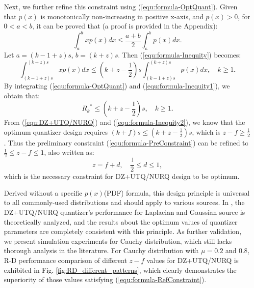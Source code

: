 \documentclass[smallabstract,smallcaptions]{dccpaper}
\begin{document}
Next, we further refine this constraint using (\ref{equ:formula-OptQuant}). Given that $p(x)$ is monotonically non-increasing in positive x-axis, and $p(x) > 0$, for $0 < a < b$, it can be proved that (a proof is provided in the Appendix):
\begin{equation}\label{equ:formula-Inequity}
	\int_a^b xp(x)dx \le \frac{a+b}{2} \int_a^b p(x)dx.
\end{equation}
Let $a=(k-1+z)s$, $b=(k+z)s$. Then (\ref{equ:formula-Inequity}) becomes:
\begin{equation}\label{equ:formula-Inequity1}
	\int_{(k-1+z)s}^{(k+z)s} xp(x)dx \le (k+z-\frac{1}{2}) s \int_{(k-1+z)s}^{(k+z)s} p(x)dx, \quad k \ge 1.
\end{equation}
By integrating (\ref{equ:formula-OptQuant}) and (\ref{equ:formula-Inequity1}), we obtain that:
\begin{equation}\label{equ:formula-Inequity2}
	{R_k}^* \le (k+z-\frac{1}{2})s, \quad k \ge 1.
\end{equation}
From (\ref{equ:DZ+UTQ/NURQ}) and (\ref{equ:formula-Inequity2}), we know that the optimum quantizer design requires $(k+f)s \le (k+z-\frac{1}{2})s$, which is $z-f \ge \frac{1}{2}$. Thus the preliminary constraint (\ref{equ:formula-PreConstraint}) can be refined to $\frac{1}{2} \le z-f \le 1$, also written as:
\begin{equation}\label{equ:formula-RefConstraint}
	z = f+d, \quad \frac{1}{2} \le d \le 1,
\end{equation}
which is the necessary constraint for DZ+UTQ/NURQ design to be optimum.

Derived without a specific $p(x)$(PDF) formula, this design principle is universal to all commonly-used distributions and should apply to various sources. In \cite{Sullivan_VCIP2005}, the DZ+UTQ/NURQ quantizer's performance for Laplacian and Gaussian source is theoretically analyzed, and the results about the optimum values of quantizer parameters are completely consistent with this principle. As further validation, we present simulation experiments for Cauchy distribution, which still lacks thorough analysis in the literature. For Cauchy distribution with $\mu = 0.2$ and $0.8$, R-D performance comparison of different $z-f$ values for DZ+UTQ/NURQ is exhibited in Fig. \ref{fig:RD_different_patterns}, which clearly demonstrates the superiority of those values satisfying (\ref{equ:formula-RefConstraint}).
\end{document}
